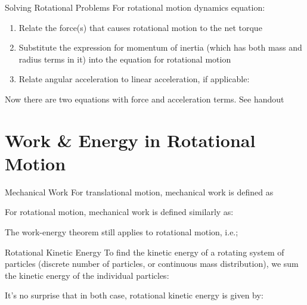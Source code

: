 \documentclass[12pt,compress,aspectratio=169]{beamer}
\begin{document}
\begin{frame}{Solving Rotational Problems}
  For rotational motion dynamics equation:
  \begin{enumerate}
  \item Relate the force(s) that causes rotational motion to the net torque

  \item Substitute the expression for momentum of inertia (which has both mass
    and radius terms in it) into the equation for rotational motion
  \item Relate angular acceleration to linear acceleration, if applicable:

  \end{enumerate}
  Now there are two equations with force and acceleration terms. See handout
\end{frame}


  
\section{Work \& Energy in Rotational Motion}

\begin{frame}{Mechanical Work}
  For translational motion, mechanical work is defined as


  For rotational motion, mechanical work is defined similarly as:


  The work-energy theorem still applies to rotational motion, i.e.;

\end{frame}


\begin{frame}{Rotational Kinetic Energy}
  To find the kinetic energy of a rotating system of particles (discrete number
  of particles, or continuous mass distribution), we sum the
  kinetic energy of the individual particles:
    
  
  It's no surprise that in both case, rotational kinetic energy is given by:
  
\end{frame}
\end{document}
